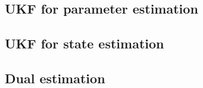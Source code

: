 \documentclass[10pt,oneside]{scrartcl}
\begin{document}
\subsection{UKF for parameter estimation}

\subsection{UKF for state estimation}

\subsection{Dual estimation}



%

\end{document}
